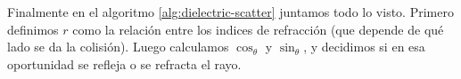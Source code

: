 Finalmente en el algoritmo \ref{alg:dielectric-scatter} juntamos todo lo visto.
Primero definimos $r$ como la relación entre los indices de refracción (que
depende de qué lado se da la colisión). Luego calculamos $\cos_{\theta}$ y
$\sin_{\theta}$, y decidimos si en esa oportunidad se refleja o se refracta el
rayo.
